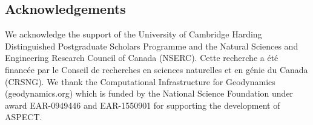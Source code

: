\subsection*{Acknowledgements}

We acknowledge the support of the University of Cambridge Harding Distinguished Postgraduate Scholars Programme and the Natural Sciences and Engineering Research Council of Canada (NSERC). Cette recherche a \'{e}t\'{e} financ\'{e}e par le Conseil de recherches en sciences naturelles et en g\'{e}nie du Canada (CRSNG). We thank the Computational Infrastructure for Geodynamics (geodynamics.org) which is funded by the National Science Foundation under award EAR-0949446 and EAR-1550901 for supporting the development of ASPECT.






%
%
%

